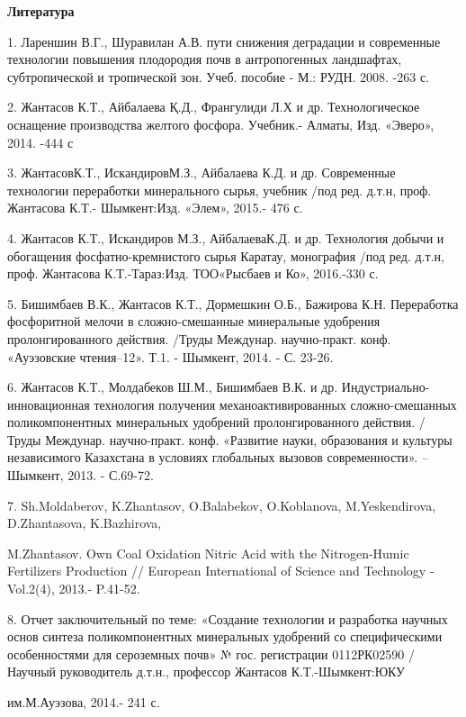 \begin{center}
{\bfseries Литература}
\end{center}

\begin{noparindent}
1. Лареншин В.Г., Шуравилан А.В. пути снижения деградации и современные
технологии повышения плодородия почв в антропогенных ландшафтах,
субтропической и тропической зон. Учеб. пособие - М.: РУДН. 2008. -263
с.

2. Жантасов К.Т., Айбалаева Қ.Д., Франгулиди Л.Х и др. Технологическое
оснащение производства желтого фосфора. Учебник.- Алматы, Изд. «Эверо»,
2014. -444 с

3. ЖантасовК.Т., ИскандировМ.З., Айбалаева К.Д. и др. Современные
технологии переработки минерального сырья, учебник /под ред. д.т.н,
проф. Жантасова К.Т.- Шымкент:Изд. «Элем», 2015.- 476 с.

4. Жантасов К.Т., Искандиров М.З., АйбалаеваК.Д. и др. Технология добычи
и обогащения фосфатно-кремнистого сырья Каратау, монография /под ред.
д.т.н, проф. Жантасова К.Т.-Тараз:Изд. ТОО«Рысбаев и Ко», 2016.-330 с.

5. Бишимбаев В.К., Жантасов К.Т., Дормешкин О.Б., Бажирова К.Н.
Переработка фосфоритной мелочи в сложно-смешанные минеральные удобрения
пролонгированного действия. /Труды Междунар. научно-практ. конф.
«Ауэзовские чтения--12». Т.1. - Шымкент, 2014. - С. 23-26.

6. Жантасов К.Т., Молдабеков Ш.М., Бишимбаев В.К. и др.
Индустриально-инновационная технология получения механоактивированных
сложно-смешанных поликомпонентных минеральных удобрений
пролонгированного действия. / Труды Междунар. научно-практ. конф.
«Развитие науки, образования и культуры независимого Казахстана в
условиях глобальных вызовов современности». -- Шымкент, 2013. - С.69-72.

7. Sh.Moldaberov, K.Zhantasov, O.Balabekov, O.Koblanova, M.Yeskendirova,
D.Zhantasova, K.Bazhirova,

M.Zhantasov. Own Coal Oxidation Nitric Acid
with the Nitrogen-Humic Fertilizers Production // European International
of Science and Technology -Vol.2(4), 2013.- P.41-52.

8. Отчет заключительный по теме: «Создание технологии и разработка
научных основ синтеза поликомпонентных минеральных удобрений со
специфическими особенностями для сероземных почв» № гос. регистрации
0112РК02590 / Научный руководитель д.т.н., профессор Жантасов
К.Т.-Шымкент:ЮКУ

им.М.Ауэзова, 2014.- 241 с.


\end{noparindent}
